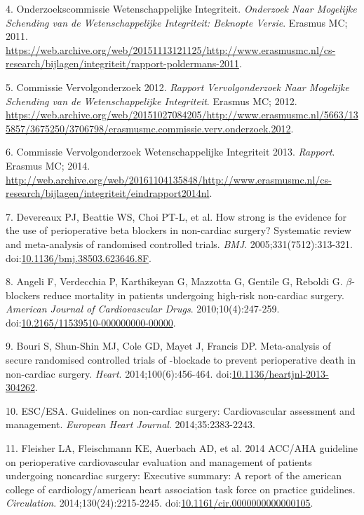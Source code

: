 \documentclass[]{article}
\begin{document}
\hypertarget{ref-commissie2011}{}
4. Onderzoekscommissie Wetenschappelijke Integriteit. \emph{Onderzoek
Naar Mogelijke Schending van de Wetenschappelijke Integriteit: Beknopte
Versie}. Erasmus MC; 2011.
\url{https://web.archive.org/web/20151113121125/http://www.erasmusmc.nl/cs-research/bijlagen/integriteit/rapport-poldermans-2011}.

\hypertarget{ref-commissie2012}{}
5. Commissie Vervolgonderzoek 2012. \emph{Rapport Vervolgonderzoek Naar
Mogelijke Schending van de Wetenschappelijke Integriteit}. Erasmus MC;
2012.
\url{https://web.archive.org/web/20151027084205/http://www.erasmusmc.nl/5663/135857/3675250/3706798/erasmusmc.commissie.verv.onderzoek.2012}.

\hypertarget{ref-commissie2013}{}
6. Commissie Vervolgonderzoek Wetenschappelijke Integriteit 2013.
\emph{Rapport}. Erasmus MC; 2014.
\url{http://web.archive.org/web/20161104135848/http://www.erasmusmc.nl/cs-research/bijlagen/integriteit/eindrapport2014nl}.

\hypertarget{ref-Devereaux313}{}
7. Devereaux PJ, Beattie WS, Choi PT-L, et al. How strong is the
evidence for the use of perioperative beta blockers in non-cardiac
surgery? Systematic review and meta-analysis of randomised controlled
trials. \emph{BMJ}. 2005;331(7512):313-321.
doi:\href{https://doi.org/10.1136/bmj.38503.623646.8F}{10.1136/bmj.38503.623646.8F}.

\hypertarget{ref-Angeli2010}{}
8. Angeli F, Verdecchia P, Karthikeyan G, Mazzotta G, Gentile G, Reboldi
G. \(\beta\)-blockers reduce mortality in patients undergoing high-risk
non-cardiac surgery. \emph{American Journal of Cardiovascular Drugs}.
2010;10(4):247-259.
doi:\href{https://doi.org/10.2165/11539510-000000000-00000}{10.2165/11539510-000000000-00000}.

\hypertarget{ref-bouri2014}{}
9. Bouri S, Shun-Shin MJ, Cole GD, Mayet J, Francis DP. Meta-analysis of
secure randomised controlled trials of -blockade to prevent
perioperative death in non-cardiac surgery. \emph{Heart}.
2014;100(6):456-464.
doi:\href{https://doi.org/10.1136/heartjnl-2013-304262}{10.1136/heartjnl-2013-304262}.

\hypertarget{ref-esc2014}{}
10. ESC/ESA. Guidelines on non-cardiac surgery: Cardiovascular
assessment and management. \emph{European Heart Journal}.
2014;35:2383-2243.

\hypertarget{ref-Fleisher_2014}{}
11. Fleisher LA, Fleischmann KE, Auerbach AD, et al. 2014 ACC/AHA
guideline on perioperative cardiovascular evaluation and management of
patients undergoing noncardiac surgery: Executive summary: A report of
the american college of cardiology/american heart association task force
on practice guidelines. \emph{Circulation}. 2014;130(24):2215-2245.
doi:\href{https://doi.org/10.1161/cir.0000000000000105}{10.1161/cir.0000000000000105}.
\end{document}
